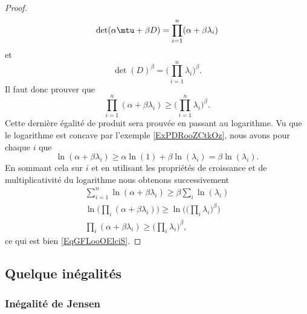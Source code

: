 \begin{proof}
    \begin{equation}
        \det(\alpha\mtu+\beta D)=\prod_{i=1}^n(\alpha+\beta\lambda_i)
    \end{equation}
    et 
    \begin{equation}
        \det(D)^{\beta}=\big( \prod_{i=1}^{n}\lambda_i \big)^{\beta}.
    \end{equation}
    Il faut donc prouver que
    \begin{equation}\label{EqGFLooOElciS}    
        \prod_{i=1}^n(\alpha+\beta\lambda_i)\geq \big( \prod_{i=1}^n\lambda_i \big)^{\beta}.
    \end{equation}
    Cette dernière égalité de produit sera prouvée en passant au logarithme. Vu que le logarithme est concave par l'exemple \ref{ExPDRooZCtkOz}, nous avons pour chaque \( i\) que
    \begin{equation}
        \ln(\alpha+\beta\lambda_i)\geq \alpha\ln(1)+\beta\ln(\lambda_i)=\beta\ln(\lambda_i).
    \end{equation}
    En sommant cela sur \( i\) et en utilisant les propriétés de croissance et de multiplicativité du logarithme nous obtenons successivement
    \begin{subequations}
        \begin{align}
            \sum_{i=1}^n\ln(\alpha+\beta\lambda_i)\geq \beta\sum_i\ln(\lambda_i)\\
            \ln\big( \prod_i(\alpha+\beta\lambda_i) \big)\geq\ln\Big( \big( \prod_i\lambda_i \big)^{\beta} \Big)\\
            \prod_i(\alpha+\beta\lambda_i)\geq\big( \prod_i\lambda_i \big)^{\beta},
        \end{align}
    \end{subequations}
    ce qui est bien \eqref{EqGFLooOElciS}.
\end{proof}

\subsection{Quelque inégalités}

\subsubsection{Inégalité de Jensen}

